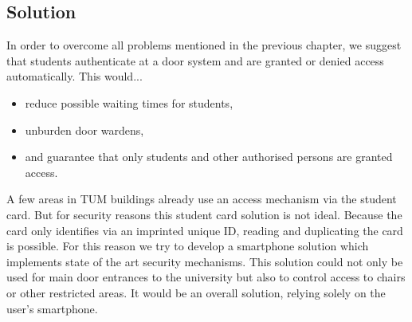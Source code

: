 \subsection{Solution}

In order to overcome all problems mentioned in the previous chapter, we suggest that students authenticate at a door system and are granted or denied access automatically. This would...

\begin{itemize}
\item reduce possible waiting times for students,
\item unburden door wardens,
\item and guarantee that only students and other authorised persons are granted access.
\end{itemize}

A few areas in TUM buildings already use an access mechanism via the student card.
But for security reasons this student card solution is not ideal.
Because the card only identifies via an imprinted unique ID, reading and duplicating the card is possible.
For this reason we try to develop a smartphone solution which implements state of the art security mechanisms.
This solution could not only be used for main door entrances to the university but also to control access to chairs or other restricted areas. It would be an overall solution, relying solely on the user's smartphone.
 
